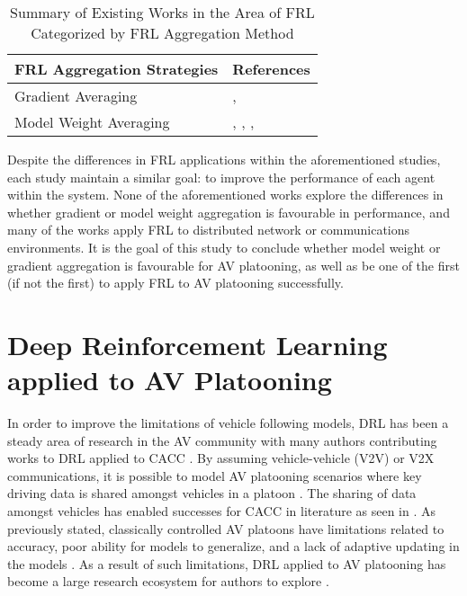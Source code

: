 \begin{table}[H]
  \centering
  \caption{Summary of Existing Works in the Area of FRL Categorized by FRL Aggregation Method}
    \begin{tabular}{ll} \toprule
    \textbf{FRL Aggregation Strategies} & \textbf{References} \\ \midrule
    \midrule
    Gradient Averaging & \cite{BrendanMcMahan2017a}, \cite{LimHyun2021} \\
    Model Weight Averaging & \cite{Liang2019}, \cite{ZhangX2020}, \cite{WangXiaofei2021}, \cite{Huang2021} \\ \bottomrule
    \end{tabular}%
  \label{tab:addlabel}%
\end{table}%


Despite the differences in FRL applications within the aforementioned studies, each study
maintain a similar goal: to improve the performance of each agent within the system.  None
of the aforementioned works explore the differences in whether gradient or model weight
aggregation is favourable in performance, and many of the works apply FRL to distributed
network or communications environments.  It is the goal of this study to conclude whether
model weight or gradient aggregation is favourable for AV platooning, as well as be one of
the first (if not the first) to apply FRL to AV platooning successfully.

\section{Deep Reinforcement Learning applied to AV Platooning} \label{sec:avRL}

In order to improve the limitations of vehicle following models, DRL has been a
steady area of research in the AV community with many authors contributing works
to DRL applied to CACC \cite{Schwarting2018, Li2019, Kendall2019, zhangYuxiang2020}.
By assuming vehicle-vehicle (V2V) or V2X communications, it is possible to model AV platooning scenarios
where key driving data is shared amongst vehicles in a platoon \cite{Schwarting2018,Hussain2019}.
The sharing of data amongst vehicles has enabled successes for CACC in literature as seen in \cite{LeiV2x}.
As previously stated, classically controlled AV platoons have limitations related to
accuracy, poor ability for models to generalize, and a lack of adaptive updating in the models \cite{Zhu2018}.
As a result of such limitations, DRL applied to AV platooning has become a large
research ecosystem for authors to explore \cite{Vinitsky2018, Kiran2020}.

